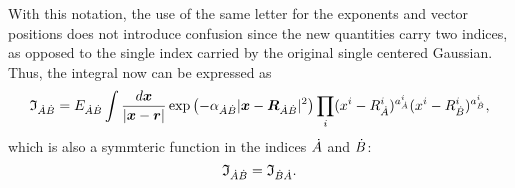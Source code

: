 With this notation, the use of the same letter for the exponents and vector positions does not introduce confusion since the new quantities carry two indices, as opposed to the single index carried by the original single centered Gaussian. Thus, the integral now can be expressed as
%
\begin{equation}\label{eq:iabred}
   \mathfrak{I}_{\dot{A}\dot{B}}=E_{\dot{A}\dot{B}}\int\frac{d\boldsymbol{x}}{|\boldsymbol{x}-\boldsymbol{r}|}
      \exp\left(-\alpha_{\dot{A}\dot{B}}|\boldsymbol{x}-\boldsymbol{R}_{\dot{A}\dot{B}}|^2\right)
      \prod_i(x^i-R_{\dot{A}}^i)^{a_{\dot{A}}^i}(x^i-R_{\dot{B}}^i)^{a_{\dot{B}}^i},
\end{equation}
%
which is also a symmteric function in the indices $\dot{A}$ and $\dot{B}$:
\begin{equation}
   \mathfrak{I}_{\dot{A}\dot{B}}=\mathfrak{I}_{\dot{B}\dot{A}}.
\end{equation}

